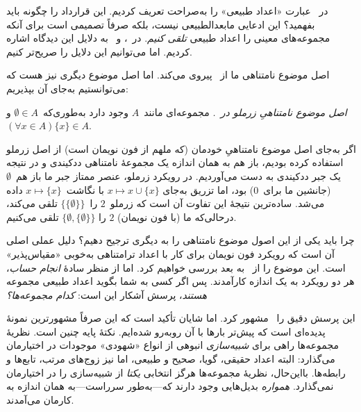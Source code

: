\documentclass[../../../include/open-logic-section]{subfiles}
\begin{document}
	


در~ عبارت «اعداد طبیعی» را به‌صراحت
تعریف کردیم. این قرارداد را چگونه باید بفهمید؟ این ادعایی مابعدالطبیعی
نیست، بلکه صرفاً تصمیمی است برای آنکه مجموعه‌های معینی را اعداد طبیعی
\emph{تلقی کنیم}. در~،
 و~
به دلایل این دیدگاه اشاره کردیم. اما می‌توانیم این دلایل را صریح‌تر کنیم.

اصل موضوع نامتناهی ما از~\citet{VonNeumann1925} پیروی می‌کند. اما اصل
موضوع دیگری نیز هست که می‌توانستیم به‌جای آن بپذیریم:

\begin{defish}
\emph{اصل موضوع نامتناهیِ زرملو در~\citeyear{Zermelo1908Untersuchungen}.}
مجموعه‌ای مانند~$A$ وجود دارد به‌طوری‌که~$\emptyset \in A$ و
$(\forall x \in A)\{x\} \in A$.
\end{defish}

اگر به‌جای اصل موضوع نامتناهیِ خودمان (که ملهم از فون نویمان است) از اصل
زرملو استفاده کرده بودیم، باز هم به همان اندازه یک مجموعهٔ نامتناهی
ددکیندی و در نتیجه یک جبر ددکیندی به دست می‌آوردیم. در رویکرد زرملو، عنصر
ممتاز جبر ما باز هم~$\emptyset$ (جانشین ما برای~$0$) بود، اما تزریق به‌جای
$x \mapsto x \cup \{x\}$ با نگاشت~$x \mapsto \{x\}$ داده می‌شد. ساده‌ترین
نتیجهٔ این تفاوت آن است که زرملو~$2$ را~$\{\{\emptyset\}\}$ تلقی می‌کند،
درحالی‌که ما (با فون نویمان) $2$ را
$\{\emptyset, \{\emptyset\}\}$ تلقی می‌کنیم.

چرا باید یکی از این اصول موضوع نامتناهی را به دیگری ترجیح دهیم؟ دلیل عملی
اصلی آن است که رویکرد فون نویمان برای کار با اعداد ترامتناهی به‌خوبی
«مقیاس‌پذیر» است. این موضوع را از~ به بعد بررسی
خواهیم کرد. اما از منظر سادهٔ \emph{انجام حساب}، هر دو رویکرد به یک اندازه
کارآمدند. پس اگر کسی به شما بگوید اعداد طبیعی مجموعه \emph{هستند}، پرسش
آشکار این است: \emph{کدام مجموعه‌ها؟}

این پرسش دقیق را~\citet{Benacerraf1965} مشهور کرد. اما شایان تأکید است که
این صرفاً مشهورترین نمونهٔ پدیده‌ای است که پیش‌تر بارها با آن روبه‌رو
شده‌ایم. نکتهٔ پایه چنین است. نظریهٔ مجموعه‌ها راهی برای \emph{شبیه‌سازی}
انبوهی از انواع «شهودی» موجودات در اختیارمان می‌گذارد: البته اعداد حقیقی،
گویا، صحیح و طبیعی، اما نیز زوج‌های مرتب، تابع‌ها و رابطه‌ها. بااین‌حال،
نظریهٔ مجموعه‌ها هرگز انتخابی \emph{یکتا} از شبیه‌سازی را در اختیارمان
نمی‌گذارد. \emph{همواره} بدیل‌هایی وجود دارند که---به‌طور سرراست---به همان
اندازه به کارمان می‌آمدند.
\end{document}
